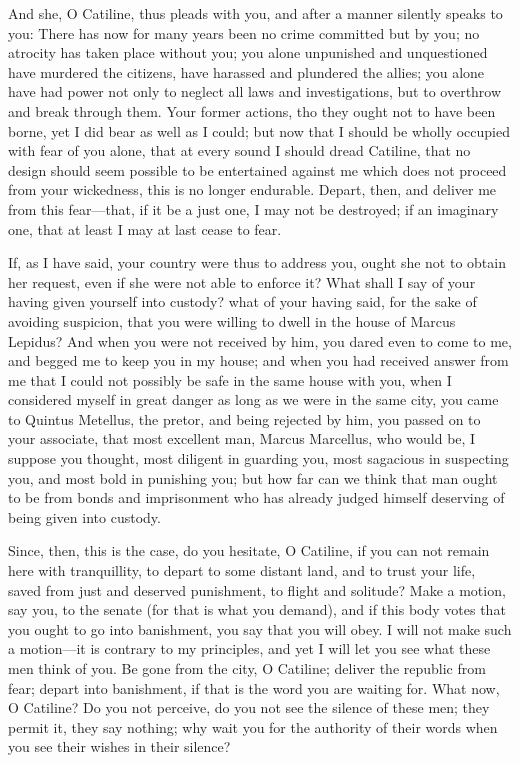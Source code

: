 \documentclass[a4paper]{amsbook}
\begin{document}
And she, O Catiline, thus pleads with you, and after a manner silently speaks to you: There has now for many years been no crime committed but by you; no atrocity has taken place without you; you alone unpunished and unquestioned have murdered the citizens, have harassed and plundered the allies; you alone have had power not only to neglect all laws and investigations, but to overthrow and break through them. Your former actions, tho they ought not to have been borne, yet I did bear as well as I could; but now that I should be wholly occupied with fear of you alone, that at every sound I should dread Catiline, that no design should seem possible to be entertained against me which does not proceed from your wickedness, this is no longer endurable. Depart, then, and deliver me from this fear—that, if it be a just one, I may not be destroyed; if an imaginary one, that at least I may at last cease to fear.

If, as I have said, your country were thus to address you, ought she not to obtain her request, even if she were not able to enforce it? What shall I say of your having given yourself into custody? what of your having said, for the sake of avoiding suspicion, that you were willing to dwell in the house of Marcus Lepidus? And when you were not received by him, you dared even to come to me, and begged me to keep you in my house; and when you had received answer from me that I could not possibly be safe in the same house with you, when I considered myself in great danger as long as we were in the same city, you came to Quintus Metellus, the pretor, and being rejected by him, you passed on to your associate, that most excellent man, Marcus Marcellus, who would be, I suppose you thought, most diligent in guarding you, most sagacious in suspecting you, and most bold in punishing you; but how far can we think that man ought to be from bonds and imprisonment who has already judged himself deserving of being given into custody.

Since, then, this is the case, do you hesitate, O Catiline, if you can not remain here with tranquillity, to depart to some distant land, and to trust your life, saved from just and deserved punishment, to flight and solitude? Make a motion, say you, to the senate (for that is what you demand), and if this body votes that you ought to go into banishment, you say that you will obey. I will not make such a motion—it is contrary to my principles, and yet I will let you see what these men think of you. Be gone from the city, O Catiline; deliver the republic from fear; depart into banishment, if that is the word you are waiting for. What now, O Catiline? Do you not perceive, do you not see the silence of these men; they permit it, they say nothing; why wait you for the authority of their words when you see their wishes in their silence?
\end{document}
